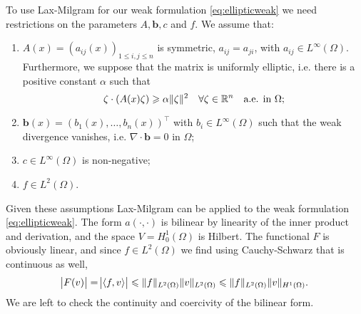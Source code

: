 \documentclass[thesis.tex]{subfiles}
\begin{document}
To use  Lax-Milgram for our weak formulation \eqref{eq:ellipticweak} we need restrictions on the parameters $A, \mathbf{b}, c$ and $f$. We assume that:
\begin{enumerate}[label=(\alph*)]
\item $A(x) = (a_{ij}(x))_{1 \leq i,j \leq n}$ is symmetric, $a_{ij} = a_{ji}$, with $a_{ij} \in L^{\infty}(\Omega)$. Furthermore, we suppose that the matrix is uniformly elliptic, i.e. there is a positive constant $\alpha$ such that 
\[
  \zeta \cdot (A(x) \zeta) \geqslant \alpha \|\zeta\|^2 \quad \forall \zeta \in \mathbb{R}^n \quad \text{a.e. in } \Omega;
\]
\item $\mathbf{b}(x) = \left(b_1(x), \dots, b_n(x)\right)^\top$ with $b_i \in L^\infty(\Omega)$ such that the weak divergence vanishes, i.e. $\nabla \cdot \mathbf{b} = 0$ in $\Omega$;
\item $c \in L^\infty(\Omega)$ is non-negative;
\item $f  \in L^2(\Omega)$.
\end{enumerate}
Given these assumptions Lax-Milgram can be applied to the weak formulation \eqref{eq:ellipticweak}. The form $a(\cdot, \cdot)$ is bilinear by linearity of the inner product and derivation, and the space $V = H_0^1(\Omega)$ is Hilbert. The functional $F$ is obviously linear, and since $f \in L^2(\Omega)$ we find using Cauchy-Schwarz that is continuous as well,
\[
  \abs{F(v)} = \abs{\left \langle f,v \right \rangle} \leqslant \|f\|_{L^2(\Omega)} \|v\|_{L^2(\Omega)} \leqslant \|f\|_{L^2(\Omega)} \|v\|_{H^1(\Omega)}.
\]
We are left to check the continuity and coercivity of the bilinear form.
\end{document}
